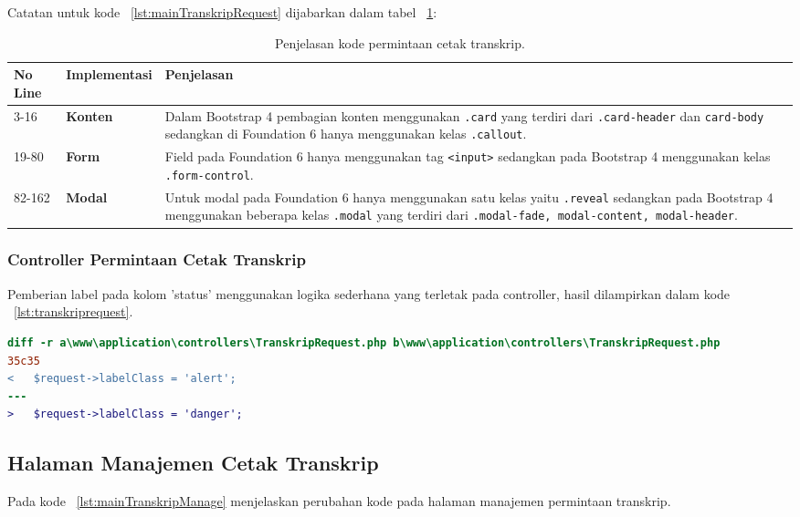 \noindent Catatan untuk kode ~\ref{lst:mainTranskripRequest} dijabarkan dalam tabel ~\ref{table:kodePermintaanCetakTranskrip}:
\begin{table}[H]
	\centering
	\caption{Penjelasan kode permintaan cetak transkrip.}
	\begin{tabularx}{\textwidth}{llX}
		\toprule
		No Line & Implementasi     & Penjelasan\\
		\midrule
		3-16 & \textbf{Konten} & Dalam Bootstrap 4 pembagian konten menggunakan \texttt{.card} yang terdiri dari \texttt{.card-header} dan \texttt{card-body} sedangkan di Foundation 6 hanya menggunakan kelas \texttt{.callout}. \\
		19-80 & \textbf{Form} & Field pada Foundation 6 hanya menggunakan tag \texttt{<input>} sedangkan pada Bootstrap 4 menggunakan kelas \texttt{.form-control}.\\
		82-162 & \textbf{Modal} & Untuk modal pada Foundation 6 hanya menggunakan satu kelas yaitu \texttt{.reveal} sedangkan pada Bootstrap 4 menggunakan beberapa kelas \texttt{.modal} yang terdiri dari \texttt{.modal-fade, modal-content, modal-header}.\\
		
		\bottomrule
	\end{tabularx}%
	\label{table:kodePermintaanCetakTranskrip}
\end{table}

\subsubsection{Controller Permintaan Cetak Transkrip}
Pemberian label pada kolom 'status' menggunakan logika sederhana yang terletak pada controller, hasil dilampirkan dalam kode ~\ref{lst:transkriprequest}.
\begin{lstlisting}[language=diff, caption=Perubahan file \www\application\controllers\TranskripRequest.php,  basicstyle=\ttfamily, frame=single,
columns=fullflexible, keepspaces=true, breaklines=true, label={lst:transkriprequest}]
diff -r a\www\application\controllers\TranskripRequest.php b\www\application\controllers\TranskripRequest.php
35c35
<   $request->labelClass = 'alert';
---
>   $request->labelClass = 'danger';
\end{lstlisting}

\subsection{Halaman Manajemen Cetak Transkrip} 
Pada kode ~\ref{lst:mainTranskripManage} menjelaskan perubahan kode pada halaman manajemen permintaan transkrip.

